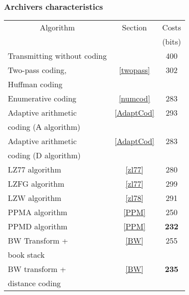 \documentclass[14pt]{beamer}
\begin{document}
\begin{frame}
\frametitle{Archivers characteristics}
\begin{itemize}    


    \begin{table}[htbp]
    \begin{center}
    \scalebox{0.6} {
    \begin{tabular}
    {|l|c|c|}\hline %
    \multicolumn{1}{|c|}{Algorithm} & Section & Costs  \\
    && (bits) \\\hline %
    Transmitting without coding& & 400 \\ \hline %
    Two-pass coding,& \ref{twopass}& 302 \\  %
    Huffman coding& & \\ \hline %
    Enumerative coding & \ref{numcod}& 283 \\ \hline %
    Adaptive arithmetic & \ref{AdaptCod}& 293 \\ %
    coding (А algorithm) &  &   \\ \hline %
    Adaptive arithmetic & \ref{AdaptCod}& 283 \\  %
    coding (D algorithm)& &  \\ \hline %
     LZ77 algorithm& \ref{zl77}& 280 \\ \hline %
     LZFG algorithm& \ref{zl77}& 299 \\ \hline %
     LZW algorithm& \ref{zl78}& 291 \\ \hline %
     PPMA algorithm& \ref{PPM}& 250 \\ \hline %
     PPMD algorithm&  \ref{PPM}& \textbf{232} \\ \hline %
     BW Transform +& \ref{BW}& 255 \\  %
     book stack& & \\ \hline %
     BW transform + & \ref{BW}& \textbf{235} \\ 
     distance coding& &  \\ \hline %
    \end{tabular}
    }
    
    \end{center}
    \end{table}


\end{itemize}
\end{frame}
\end{document}

